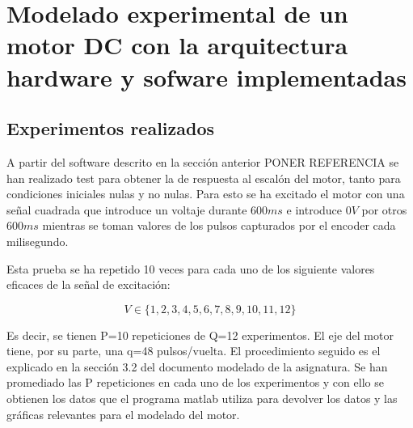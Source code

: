 \documentclass{article}
\begin{document}
\section{Modelado experimental de un motor DC con la arquitectura hardware y sofware implementadas}
\subsection{Experimentos realizados}
A partir del software descrito en la sección anterior PONER REFERENCIA se han realizado test para obtener la de respuesta al escalón del motor,
tanto para condiciones iniciales nulas y no nulas.
Para esto se ha excitado el motor con una señal cuadrada que introduce un voltaje durante $600ms$ e introduce $0V$ por otros $600ms$
mientras se toman valores de los pulsos capturados por el encoder cada milisegundo.

Esta prueba se ha repetido 10 veces para cada uno de los siguiente valores eficaces de la señal de excitación:

\begin{displaymath}
V \in \{1,2,3,4,5,6,7,8,9,10,11,12\}
\end{displaymath}

Es decir, se tienen P=10 repeticiones de Q=12 experimentos. El eje del motor tiene, por su parte, una q=48 pulsos/vuelta.
El procedimiento seguido es el explicado en la sección 3.2 del documento modelado de la asignatura. Se han promediado las P repeticiones en cada uno de los experimentos y con ello se obtienen los datos que el programa matlab utiliza para devolver los datos y las gráficas relevantes para el modelado del motor.
\end{document}
